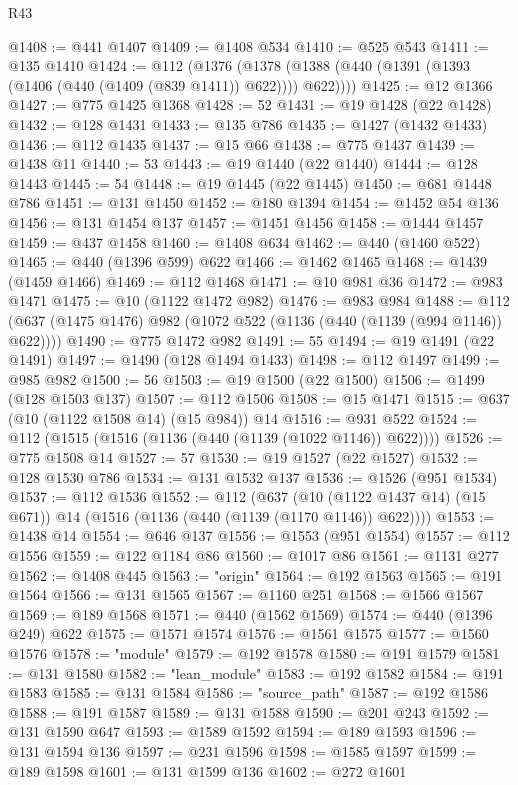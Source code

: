 \begin{lexlean}{R43}
\begin{coremodule}
@1408 := @441 @1407
@1409 := @1408 @534
@1410 := @525 @543
@1411 := @135 @1410
@1424 := @112
    (@1376 (@1378 (@1388 (@440 (@1391 (@1393 (@1406 (@440 (@1409 (@839 @1411)) @622)))) @622))))
@1425 := @12 @1366
@1427 := @775 @1425 @1368
@1428 := 52
@1431 := @19 @1428 (@22 @1428)
@1432 := @128 @1431
@1433 := @135 @786
@1435 := @1427 (@1432 @1433)
@1436 := @112 @1435
@1437 := @15 @66
@1438 := @775 @1437
@1439 := @1438 @11
@1440 := 53
@1443 := @19 @1440 (@22 @1440)
@1444 := @128 @1443
@1445 := 54
@1448 := @19 @1445 (@22 @1445)
@1450 := @681 @1448 @786
@1451 := @131 @1450
@1452 := @180 @1394
@1454 := @1452 @54 @136
@1456 := @131 @1454 @137
@1457 := @1451 @1456
@1458 := @1444 @1457
@1459 := @437 @1458
@1460 := @1408 @634
@1462 := @440 (@1460 @522)
@1465 := @440 (@1396 @599) @622
@1466 := @1462 @1465
@1468 := @1439 (@1459 @1466)
@1469 := @112 @1468
@1471 := @10 @981 @36
@1472 := @983 @1471
@1475 := @10 (@1122 @1472 @982)
@1476 := @983 @984
@1488 := @112 (@637 (@1475 @1476) @982 (@1072 @522 (@1136 (@440 (@1139 (@994 @1146)) @622))))
@1490 := @775 @1472 @982
@1491 := 55
@1494 := @19 @1491 (@22 @1491)
@1497 := @1490 (@128 @1494 @1433)
@1498 := @112 @1497
@1499 := @985 @982
@1500 := 56
@1503 := @19 @1500 (@22 @1500)
@1506 := @1499 (@128 @1503 @137)
@1507 := @112 @1506
@1508 := @15 @1471
@1515 := @637 (@10 (@1122 @1508 @14) (@15 @984)) @14
@1516 := @931 @522
@1524 := @112 (@1515 (@1516 (@1136 (@440 (@1139 (@1022 @1146)) @622))))
@1526 := @775 @1508 @14
@1527 := 57
@1530 := @19 @1527 (@22 @1527)
@1532 := @128 @1530 @786
@1534 := @131 @1532 @137
@1536 := @1526 (@951 @1534)
@1537 := @112 @1536
@1552 := @112
    (@637 (@10 (@1122 @1437 @14) (@15 @671)) @14 (@1516 (@1136 (@440 (@1139 (@1170 @1146)) @622))))
@1553 := @1438 @14
@1554 := @646 @137
@1556 := @1553 (@951 @1554)
@1557 := @112 @1556
@1559 := @122 @1184 @86
@1560 := @1017 @86
@1561 := @1131 @277
@1562 := @1408 @445
@1563 := "origin"
@1564 := @192 @1563
@1565 := @191 @1564
@1566 := @131 @1565
@1567 := @1160 @251
@1568 := @1566 @1567
@1569 := @189 @1568
@1571 := @440 (@1562 @1569)
@1574 := @440 (@1396 @249) @622
@1575 := @1571 @1574
@1576 := @1561 @1575
@1577 := @1560 @1576
@1578 := "module"
@1579 := @192 @1578
@1580 := @191 @1579
@1581 := @131 @1580
@1582 := "lean_module"
@1583 := @192 @1582
@1584 := @191 @1583
@1585 := @131 @1584
@1586 := "source_path"
@1587 := @192 @1586
@1588 := @191 @1587
@1589 := @131 @1588
@1590 := @201 @243
@1592 := @131 @1590 @647
@1593 := @1589 @1592
@1594 := @189 @1593
@1596 := @131 @1594 @136
@1597 := @231 @1596
@1598 := @1585 @1597
@1599 := @189 @1598
@1601 := @131 @1599 @136
@1602 := @272 @1601

\end{coremodule}
\end{lexlean}
